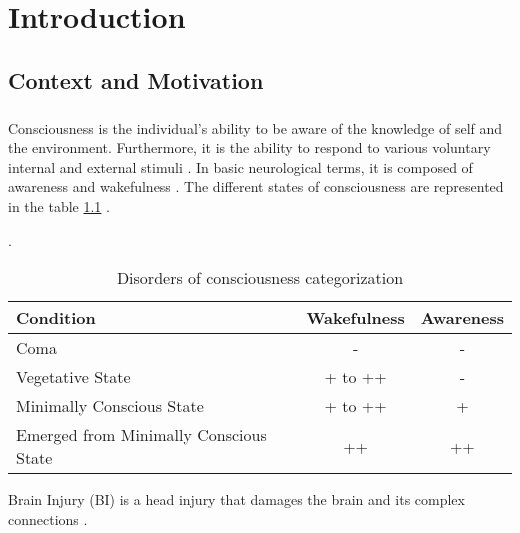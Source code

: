 \chapter{Introduction} \label{chap:intro}

\section*{Context and Motivation} \label{sec:context} 

 \paragraph{}Consciousness is the individual's ability to be aware of the knowledge of self and the environment. Furthermore, it is the ability to respond to various voluntary internal and
external stimuli \citet{https://doi.org/10.1196/annals.1440.013}.
In basic neurological terms, it is composed of awareness and wakefulness \citet{zheng2017disentangling}.
The different states of consciousness are represented in the table \ref{tab: States} 
.

\begin{table}[!htb].

\begin{tabular}{|l|c|c|}
\hline
Condition                              & \multicolumn{1}{l|}{\textbf{Wakefulness}} & \multicolumn{1}{l|}{\textbf{Awareness}} \\ \hline
Coma                                   & -                                         & -                                       \\ \hline
\rowcolor[HTML]{FFFC9E} 
Vegetative State                       & + to ++                                   & -                                       \\ \hline
\rowcolor[HTML]{FFFC9E} 
Minimally Conscious State              & + to ++                                   & +                                       \\ \hline
Emerged from Minimally Conscious State & ++                                        & ++                                      \\ \hline
\end{tabular}%
\caption{Disorders of consciousness categorization}
\label{tab: States}
\end{table}
\vspace{0.2cm}
Brain Injury (BI) is a head injury that damages the brain and its complex connections \citep{HongSong2017}. 

